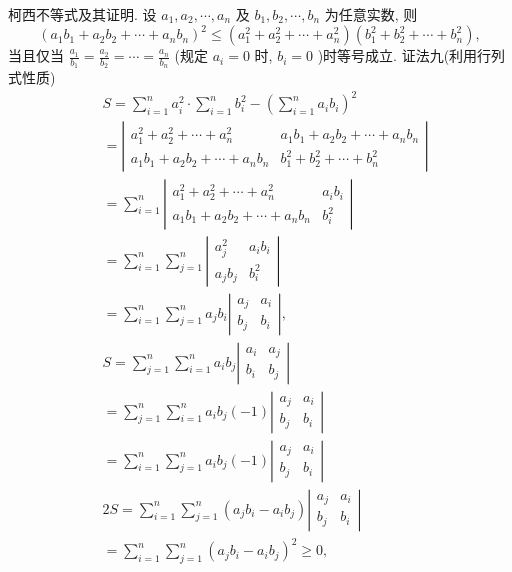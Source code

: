 柯西不等式及其证明.
设 $a_1, a_2, \cdots, a_n$ 及 $b_1, b_2, \cdots, b_n$ 为任意实数, 则
$$
\left(a_1 b_1+a_2 b_2+\cdots+a_n b_n\right)^2 \leqslant\left(a_1^2+a_2^2+\cdots+a_n^2\right)\left(b_1^2+b_2^2+\cdots+b_n^2\right),
$$
当且仅当 $\frac{a_1}{b_1}=\frac{a_2}{b_2}=\cdots=\frac{a_n}{b_n}$ (规定 $a_i=0$ 时, $b_i=0$ )时等号成立.
证法九(利用行列式性质)
$$
\begin{aligned}
& S=\sum_{i=1}^n a_i^2 \cdot \sum_{i=1}^n b_i^2-\left(\sum_{i=1}^n a_i b_i\right)^2 \\
&=\left|\begin{array}{cc}
a_1^2+a_2^2+\cdots+a_n^2 & a_1 b_1+a_2 b_2+\cdots+a_n b_n \\
a_1 b_1+a_2 b_2+\cdots+a_n b_n & b_1^2+b_2^2+\cdots+b_n^2
\end{array}\right| \\
&=\sum_{i=1}^n\left|\begin{array}{cc}
a_1^2+a_2^2+\cdots+a_n^2 & a_i b_i \\
a_1 b_1+a_2 b_2+\cdots+a_n b_n & b_i^2
\end{array}\right| \\
&=\sum_{i=1}^n \sum_{j=1}^n\left|\begin{array}{cc}
a_j^2 & a_i b_i \\
a_j b_j & b_i^2
\end{array}\right| \\
&=\sum_{i=1}^n \sum_{j=1}^n a_j b_i\left|\begin{array}{cc}
a_j & a_i \\
b_j & b_i
\end{array}\right|, \\
& S=\sum_{j=1}^n \sum_{i=1}^n a_i b_j\left|\begin{array}{cc}
a_i & a_j \\
b_i & b_j
\end{array}\right| \\
&=\sum_{j=1}^n \sum_{i=1}^n a_i b_j(-1)\left|\begin{array}{cc}
a_j & a_i \\
b_j & b_i
\end{array}\right| \\
&=\sum_{i=1}^n \sum_{j=1}^n a_i b_j(-1)\left|\begin{array}{ll}
a_j & a_i \\
b_j & b_i
\end{array}\right| \\
& 2 S=\sum_{i=1}^n \sum_{j=1}^n\left(a_j b_i-a_i b_j\right)\left|\begin{array}{ll}
a_j & a_i \\
b_j & b_i
\end{array}\right| \\
&=\sum_{i=1}^n \sum_{j=1}^n\left(a_j b_i-a_i b_j\right)^2 \geqslant 0,
\end{aligned}
$$
